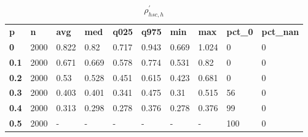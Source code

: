 \begin{table}[h]
 \centering 
\footnotesize
\caption{$\rho_{hsc,h}^\prime $}
\label{tab:alphahsch}
\begin{tabular}[h]{| l l l l l l l l l l|
    } \hline
\textbf{ p} & \textbf{ n} & \textbf{ avg} & \textbf{ med} & \textbf{ q025} & \textbf{ q975} & \textbf{ min} & \textbf{ max} & \textbf{ pct\_0} & \textbf{ pct\_nan}
           \\
  \textbf{  0} & 2000 & 0.822 &  0.82 & 0.717 & 0.943 & 0.669 & 1.024 &   0 & 0
           \\
  \textbf{0.1} & 2000 & 0.671 & 0.669 & 0.578 & 0.774 & 0.531 &  0.82 &   0 & 0
           \\
  \textbf{0.2} & 2000 &  0.53 & 0.528 & 0.451 & 0.615 & 0.423 & 0.681 &   0 & 0
           \\
  \textbf{0.3} & 2000 & 0.403 & 0.401 & 0.341 & 0.475 &  0.31 & 0.515 &  56 & 0
           \\
  \textbf{0.4} & 2000 & 0.313 & 0.298 & 0.278 & 0.376 & 0.278 & 0.376 &  99 & 0
           \\
  \textbf{0.5} & 2000 & - & - & - & - & - & - & 100 & 0
           \\
 \hline \end{tabular}
 \end{table}
